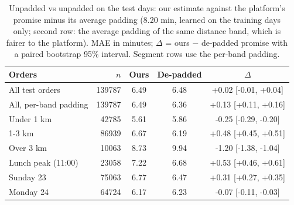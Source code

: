 \begin{table}[t]
\centering
\caption{Unpadded vs unpadded on the test days: our estimate against the platform's promise minus its average padding (8.20 min, learned on the training days only; second row: the average padding of the same distance band, which is fairer to the platform). MAE in minutes; $\Delta$ = ours $-$ de-padded promise with a paired bootstrap 95\% interval. Segment rows use the per-band padding.}
\label{tab:depadded}
\small
\begin{tabular}{@{}lrccc@{}}
\toprule
Orders & $n$ & Ours & De-padded & $\Delta$ \\
\midrule
All test orders & \num{139787} & 6.49 & 6.48 & +0.02 [-0.01, +0.04] \\
All, per-band padding & \num{139787} & 6.49 & 6.36 & +0.13 [+0.11, +0.16] \\
\midrule
Under 1 km & \num{42785} & 5.61 & 5.86 & -0.25 [-0.29, -0.20] \\
1-3 km & \num{86939} & 6.67 & 6.19 & +0.48 [+0.45, +0.51] \\
Over 3 km & \num{10063} & 8.73 & 9.94 & -1.20 [-1.38, -1.04] \\
Lunch peak (11:00) & \num{23058} & 7.22 & 6.68 & +0.53 [+0.46, +0.61] \\
Sunday 23 & \num{75063} & 6.77 & 6.47 & +0.31 [+0.27, +0.35] \\
Monday 24 & \num{64724} & 6.17 & 6.23 & -0.07 [-0.11, -0.03] \\
\bottomrule
\end{tabular}
\end{table}
